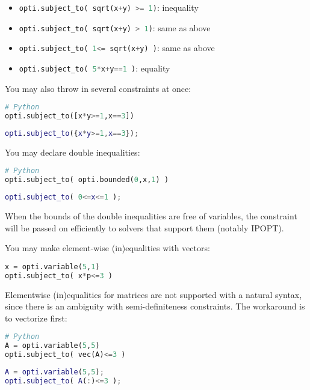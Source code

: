 \documentclass[a4paper,12pt]{book}
\newcommand{\python}[1]{\lstinline[language=Python]{#1}}
\begin{document}
\begin{itemize}
  \item[] \python{opti.subject_to( sqrt(x+y) >= 1)}: inequality
  \item[] \python{opti.subject_to( sqrt(x+y) > 1)}: same as above
  \item[] \python{opti.subject_to( 1<= sqrt(x+y) )}: same as above
  \item[] \python{opti.subject_to( 5*x+y==1 )}: equality
\end{itemize}

You may also throw in several constraints at once:\\
\begin{minipage}[t]{0.5\textwidth}
\begin{lstlisting}[language=Python]
# Python
opti.subject_to([x*y>=1,x==3])
\end{lstlisting}
\end{minipage}
\begin{minipage}[t]{0.5\textwidth}
\begin{lstlisting}[language=Matlab]
% MATLAB/Octave
opti.subject_to({x*y>=1,x==3});
\end{lstlisting}
\end{minipage}

You may declare double inequalities:\\
\begin{lstlisting}[language=Python]
# Python
opti.subject_to( opti.bounded(0,x,1) )
\end{lstlisting}
\begin{lstlisting}[language=Matlab]
% MATLAB/Octave
opti.subject_to( 0<=x<=1 );
\end{lstlisting}

When the bounds of the double inequalities are free of variables, the constraint will be passed on efficiently to solvers that support them (notably IPOPT).

You may make element-wise (in)equalities with vectors:

\begin{lstlisting}[language=Python]
x = opti.variable(5,1)
opti.subject_to( x*p<=3 )
\end{lstlisting}

Elementwise (in)equalities for matrices are not supported with a natural syntax,
since there is an ambiguity with semi-definiteness constraints.
The workaround is to vectorize first:\\
\begin{minipage}[t]{0.5\textwidth}
\begin{lstlisting}[language=Python]
# Python
A = opti.variable(5,5)
opti.subject_to( vec(A)<=3 )
\end{lstlisting}
\end{minipage}
\begin{minipage}[t]{0.5\textwidth}
\begin{lstlisting}[language=Matlab]
% MATLAB/Octave
A = opti.variable(5,5);
opti.subject_to( A(:)<=3 );
\end{lstlisting}
\end{minipage}
\end{document}
